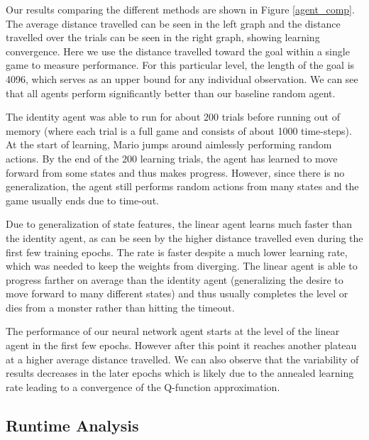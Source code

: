 \documentclass[12pt]{article}
\begin{document}
Our results comparing the different methods are shown in Figure \ref{agent_comp}. The average distance travelled can be seen in the left graph and the distance travelled over the trials can be seen in the right graph, showing learning convergence. Here we use the distance travelled toward the goal within a single game to measure performance. For this particular level, the length of the goal is 4096, which serves as an upper bound for any individual observation. We can see that all agents perform significantly better than our baseline random agent. 

The identity agent was able to run for about 200 trials before running out of memory (where each trial is a full game and consists of about 1000 time-steps). At the start of learning, Mario jumps around aimlessly performing random actions. By the end of the 200 learning trials, the agent has learned to move forward from some states and thus makes progress. However, since there is no generalization, the agent still performs random actions from many states and the game usually ends due to time-out. 

Due to generalization of state features, the linear agent learns much faster than the identity agent, as can be seen by the higher distance travelled even during the first few training epochs. The rate is faster despite a much lower learning rate, which was needed to keep the weights from diverging. The linear agent is able to progress farther on average than the identity agent (generalizing the desire to move forward to many different states) and thus usually completes the level or dies from a monster rather than hitting the timeout. 

The performance of our neural network agent starts at the level of the linear agent in the first few epochs. However after this point it reaches another plateau at a higher average distance travelled. We can also observe that the variability of results decreases in the later epochs which is likely due to the annealed learning rate leading to a convergence of the Q-function approximation.

\subsection{Runtime Analysis}
\end{document}
